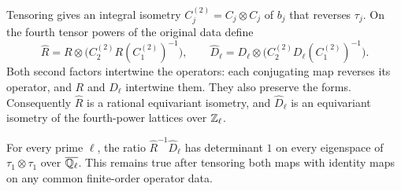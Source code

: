 Tensoring gives an integral isometry
$C_j^{(2)}=C_j\otimes C_j$ of $b_j$ that reverses $\tau_j$.
On the fourth tensor powers of the original data define
\begin{equation}
\label{global:corrected-maps}
 \widehat R
 =R\otimes\bigl(C_2^{(2)}R(C_1^{(2)})^{-1}\bigr),
 \qquad
 \widehat D_\ell
 =D_\ell\otimes\bigl(C_2^{(2)}D_\ell(C_1^{(2)})^{-1}\bigr).
\end{equation}
Both second factors intertwine the operators: each conjugating map
reverses its operator, and $R$ and $D_\ell$ intertwine them.
They also preserve the forms.  Consequently $\widehat R$ is a rational
equivariant isometry, and $\widehat D_\ell$ is an equivariant isometry
of the fourth-power lattices over $\mathbb Z_\ell$.

\begin{lemma}
\label{global:determinants}
For every prime $\ell$, the ratio
$\widehat R^{-1}\widehat D_\ell$ has determinant $1$ on every
eigenspace of $\tau_1\otimes\tau_1$ over $\overline{\mathbb Q_\ell}$.
This remains true after tensoring both maps with identity maps on any
common finite-order operator data.
\end{lemma}

